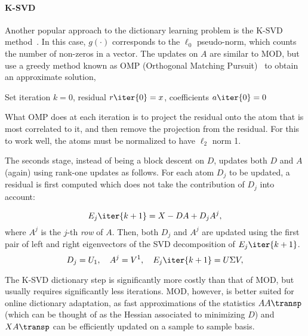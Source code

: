 \documentclass[a4paper]{IEEEtran}
\begin{document}
\paragraph{K-SVD} Another popular approach to the dictionary learning problem is the  K-SVD method~\cite{ksvd}. In this case, $g(\cdot)$ corresponds to the $\ell_0$ pseudo-norm, which counts the number of non-zeros in a vector. The updates on $A$ are similar to MOD, but use a greedy method known as OMP (Orthogonal Matching Pursuit)~\cite{omp} to obtain an approximate solution,


\begin{algorithm}[ht]
Set iteration $k=0$, residual $r\iter{0}=x$, coefficients $a\iter{0}=0$\;
\label{alg:omp}
\end{algorithm}

What OMP does at each iteration is to project the residual onto the atom that is most correlated to it, and then remove the projection from the residual. For this to work well, the atoms must be normalized to have $\ell_2$ norm 1.

The seconds stage, instead of being a block descent on $D$, updates both $D$ and $A$ (again) using rank-one updates as follows. For each atom $D_j$ to be updated, a residual is first computed which does not take the contribution of $D_j$ into account:

\begin{equation}
E_j\iter{k+1} = X - DA + D_jA^j,
\label{eq:ksvd2}
\end{equation}
where $A^j$ is the $j$-th \emph{row} of $A$. Then, both $D_j$ and $A^j$ are updated using the first pair of left and right eigenvectors of the SVD decomposition of $E_j\iter{k+1}$. 
\begin{equation}
D_j = U_1,\quad A^j=V^1,\quad E_j\iter{k+1} = U\Sigma V,
\label{eq:ksvd3}
\end{equation}

The K-SVD dictionary step is significantly more costly than that of MOD, but usually requires significantly less iterations. MOD, however, is better suited for online dictionary adaptation, as fast approximations of the statistics $AA\transp$ (which can be thought of as the Hessian associated to minimizing $D$)  and $XA\transp$ can be efficiently updated on a sample to sample basis.
\end{document}
